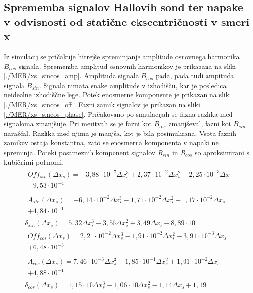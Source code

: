 \subsection{Sprememba signalov Hallovih sond ter napake v odvisnosti od statične ekscentričnosti v smeri x}
Iz simulacij se pričakuje hitrejše spreminjanje amplitude osnovnega harmonika $B_{cos}$ signala. Sprememba amplitud osnovnih harmonikov je prikazana na sliki \ref{./MER/xs_sincos_amp}. Amplituda signala $B_{cos}$ pada, pada tudi ampituda signala $B_{sin}$. Signala nimata enake amplitude v izhodišču, kar je posledica neidealne izhodiščne lege. Potek enosmerne komponente je prikazan na sliki \ref{./MER/xs_sincos_off}. Fazni zamik signalov je prikazan na sliki \ref{./MER/xs_sincos_phase}. Pričakovano po simulacijah se fazna razlika med signaloma zmanjšuje. Pri meritvah se je fazni kot $B_{cos}$ zmanjševal, fazni kot $B_{sin}$ naraščal. Razlika med njima je manjša, kot je bila posimulirana. Vsota faznih zamikov ostaja konstantna, zato se enosmerna komponenta v napaki ne spreminja.
Poteki posameznih komponent signalov $B_{sin}$ in $B_{cos}$ so aproksimirani s kubičnimi polinomi.
\begin{eqnarray}
&\begin{split}
Off_{sin}(\Delta x_s) =-3,88\cdot 10^{-2}\Delta x_s^{3}+2,37\cdot 10^{-2}\Delta x_s^{2}-2,25\cdot 10^{-3}\Delta x_s\\-9,53\cdot 10^{-4} \end{split}\\
&\begin{split}A_{sin}(\Delta x_s) =-6,14\cdot 10^{-2}\Delta x_s^{3}-1,71\cdot 10^{-2}\Delta x_s^{2}-1,17\cdot 10^{-2}\Delta x_s\\+4,84\cdot 10^{-1} \end{split}\\  
&\delta_{sin}(\Delta x_s) =5,32\Delta x_s^{3}-3,55\Delta x_s^{2}+3,49\Delta x_s-8,89\cdot 10 \\                                          
&\begin{split}Off_{cos}(\Delta x_s) =2,21\cdot 10^{-2}\Delta x_s^{3}-1,91\cdot 10^{-2}\Delta x_s^{2}-3,91\cdot 10^{-3}\Delta x_s\\+6,48\cdot 10^{-3} \end{split}\\ 
&\begin{split}A_{cos}(\Delta x_s) =7,46\cdot 10^{-3}\Delta x_s^{3}-1,85\cdot 10^{-1}\Delta x_s^{2}+1,01\cdot 10^{-2}\Delta x_s\\+4,88\cdot 10^{-1} \end{split}\\   
&\delta_{cos}(\Delta x_s) =1,15\cdot 10\Delta x_s^{3}-1,06\cdot 10\Delta x_s^{2}-1,14\Delta x_s+1,19 
\end{eqnarray}


